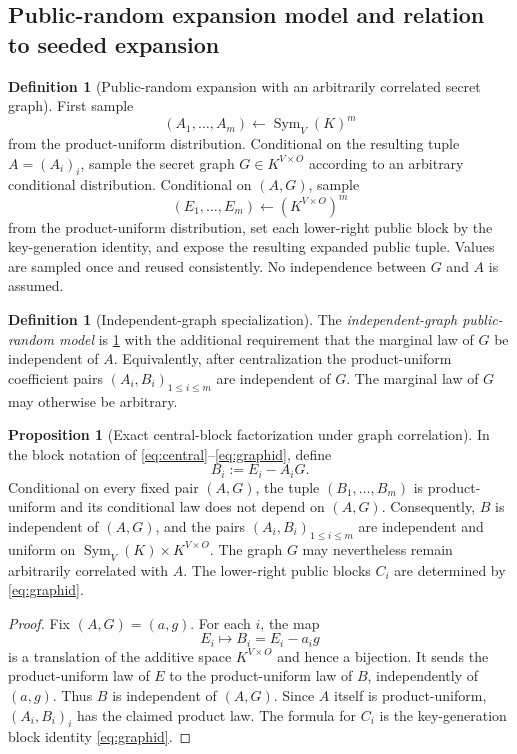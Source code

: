 \documentclass[11pt,a4paper]{article}
\theoremstyle{definition}
\newtheorem{proposition}[theorem]{Proposition}
\newtheorem{definition}[theorem]{Definition}
\theoremstyle{remark}
\newcommand{\Sym}{\operatorname{Sym}}
\begin{document}
\subsection{Public-random expansion model and relation to seeded expansion}

\begin{definition}[Public-random expansion with an arbitrarily correlated secret graph]\label{def:ideal}
First sample
\[
(A_1,\ldots,A_m)\leftarrow\Sym_V(K)^m
\]
from the product-uniform distribution.  Conditional on the resulting tuple $A=(A_i)_i$, sample the secret graph $G\in K^{V\times O}$ according to an arbitrary conditional distribution.  Conditional on $(A,G)$, sample
\[
(E_1,\ldots,E_m)\leftarrow(K^{V\times O})^m
\]
from the product-uniform distribution, set each lower-right public block by the key-generation identity, and expose the resulting expanded public tuple.  Values are sampled once and reused consistently.  No independence between $G$ and $A$ is assumed.
\end{definition}

\begin{definition}[Independent-graph specialization]\label{def:direct-ideal}
The \emph{independent-graph public-random model} is \cref{def:ideal} with the
additional requirement that the marginal law of $G$ be independent of $A$.
Equivalently, after centralization the product-uniform coefficient pairs
$(A_i,B_i)_{1\le i\le m}$ are independent of $G$.  The marginal law of $G$
may otherwise be arbitrary.
\end{definition}

\begin{proposition}[Exact central-block factorization under graph correlation]\label{prop:ideal-factorization}
In the block notation of \eqref{eq:central}--\eqref{eq:graphid}, define
\[
B_i:=E_i-A_iG.
\]
Conditional on every fixed pair $(A,G)$, the tuple $(B_1,\ldots,B_m)$ is product-uniform and its conditional law does not depend on $(A,G)$.  Consequently, $B$ is independent of $(A,G)$, and the pairs $(A_i,B_i)_{1\le i\le m}$ are independent and uniform on $\Sym_V(K)\times K^{V\times O}$.  The graph $G$ may nevertheless remain arbitrarily correlated with $A$.  The lower-right public blocks $C_i$ are determined by \eqref{eq:graphid}.
\end{proposition}

\begin{proof}
Fix $(A,G)=(a,g)$.  For each $i$, the map
\[
E_i\longmapsto B_i=E_i-a_ig
\]
is a translation of the additive space $K^{V\times O}$ and hence a bijection.  It sends the product-uniform law of $E$ to the product-uniform law of $B$, independently of $(a,g)$.  Thus $B$ is independent of $(A,G)$.  Since $A$ itself is product-uniform, $(A_i,B_i)_i$ has the claimed product law.  The formula for $C_i$ is the key-generation block identity \eqref{eq:graphid}.
\end{proof}
\end{document}
